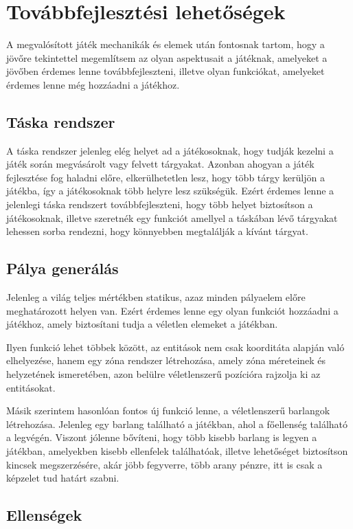 \chapter{Továbbfejlesztési lehetőségek}

A megvalósított játék mechanikák és elemek után fontosnak tartom, hogy a jövőre tekintettel megemlítsem az olyan aspektusait a játéknak, amelyeket a jövőben érdemes lenne továbbfejleszteni, illetve olyan funkciókat, amelyeket érdemes lenne még hozzáadni a játékhoz.



\section{Táska rendszer}

A táska rendszer jelenleg elég helyet ad a játékosoknak, hogy tudják kezelni a játék során megvásárolt vagy felvett tárgyakat. Azonban ahogyan a játék fejlesztése fog haladni előre, elkerülhetetlen lesz, hogy több tárgy kerüljön a játékba, így a játékosoknak több helyre lesz szükségük. Ezért érdemes lenne a jelenlegi táska rendszert továbbfejleszteni, hogy több helyet biztosítson a játékosoknak, illetve szeretnék egy funkciót amellyel a táskában lévő tárgyakat lehessen sorba rendezni, hogy könnyebben megtalálják a kívánt tárgyat.

\section{Pálya generálás}
Jelenleg a világ teljes mértékben statikus, azaz minden pályaelem előre meghatározott helyen van. Ezért érdemes lenne egy olyan funkciót hozzáadni a játékhoz, amely biztosítani tudja a véletlen elemeket a játékban.

Ilyen funkció lehet többek között, az entitások nem csak koorditáta alapján való elhelyezése, hanem egy zóna rendszer létrehozása, amely zóna méreteinek és helyzetének ismeretében, azon belülre véletlenszerű pozícióra rajzolja ki az entitásokat.

Másik szerintem hasonlóan fontos új funkció lenne, a véletlenszerű barlangok létrehozása. Jelenleg egy barlang található a játékban, ahol a főellenség található a legvégén. Viszont jólenne bővíteni, hogy több kisebb barlang is legyen a játékban, amelyekben kisebb ellenfelek találhatóak, illetve lehetőséget biztosítson kincsek megszerzésére, akár jöbb fegyverre, több arany pénzre, itt is csak a képzelet tud határt szabni.

\section{Ellenségek}

